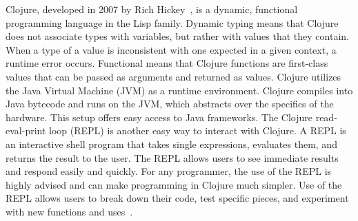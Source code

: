 \documentclass[12pt]{article}
\newcommand{\comment}[1]{{\bf \tt  {#1}}}
\newcommand{\emcomment}[1]{\textcolor{ForestGreen}{\comment{Elena: {#1}}}}
\newcommand{\hfcomment}[1]{\textcolor{Teal}{\comment{Henry: {#1}}}}
\begin{document}
  
Clojure, developed in 2007 by Rich Hickey~\cite{Hickey:2008}, is a dynamic, functional
programming language in the Lisp family.
Dynamic typing means that Clojure does not associate types with variables, but rather with values that they contain.
When a type of a value is inconsistent with one expected in a given context, a runtime error occurs.
Functional means
that Clojure functions are first-class values that can be passed as arguments and returned
as values.
Clojure utilizes the Java Virtual Machine (JVM) as a runtime environment. Clojure compiles into Java bytecode
and runs on the JVM, which abstracts over the specifics of the hardware.
This setup offers easy 
access to Java frameworks. The Clojure read-eval-print loop (REPL)
is another easy way to interact 
 with Clojure. A REPL is an interactive shell program that takes single 
expressions, evaluates them, and returns the result to the user. The REPL allows users to see 
immediate results and respond easily and quickly. For any programmer, the use of the REPL 
is highly advised and can make programming in Clojure much simpler. Use of the REPL allows users
to break down their code, test specific pieces, and experiment with new functions and uses~\cite{clojure-REPL}.
\end{document}
